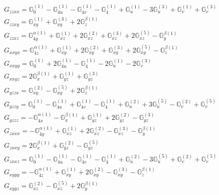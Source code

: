 \documentclass[fleqn,8pt,landscape]{jsarticle}
\begin{document}
\begin{align*}
& G_{zzxx} = \mathbb{G}_{0}^{(1)} - \mathbb{G}_{4u}^{(1)} - \mathbb{G}_{4v}^{(1)} - \mathbb{G}_{4}^{(1)} + \mathbb{G}_{u}^{(1)} - 3 \mathbb{G}_{u}^{(3)} + \mathbb{G}_{v}^{(1)} + \mathbb{G}_{v}^{(3)} \\
& G_{zzxy} = \mathbb{G}_{xy}^{(1)} + \mathbb{G}_{xy}^{(3)} + 2 \mathbb{G}_{z}^{\beta(1)} \\
& G_{zzxz} = \mathbb{G}_{4y}^{\alpha(1)} + \mathbb{G}_{xz}^{(1)} + 2 \mathbb{G}_{xz}^{(2)} + \mathbb{G}_{xz}^{(3)} + 2 \mathbb{G}_{xz}^{(5)} - \mathbb{G}_{y}^{\beta(1)} \\
& G_{xxyx} = \mathbb{G}_{4z}^{\alpha(1)} + \mathbb{G}_{xy}^{(1)} + 2 \mathbb{G}_{xy}^{(2)} + \mathbb{G}_{xy}^{(3)} + 2 \mathbb{G}_{xy}^{(5)} - \mathbb{G}_{z}^{\beta(1)} \\
& G_{xxyy} = \mathbb{G}_{0}^{(1)} + 2 \mathbb{G}_{4u}^{(1)} - \mathbb{G}_{4}^{(1)} - 2 \mathbb{G}_{u}^{(1)} - 2 \mathbb{G}_{v}^{(3)} \\
& G_{xxyz} = 2 \mathbb{G}_{x}^{\beta(1)} + \mathbb{G}_{yz}^{(1)} + \mathbb{G}_{yz}^{(3)} \\
& G_{yzzx} = \mathbb{G}_{xy}^{(2)} - \mathbb{G}_{xy}^{(5)} + 2 \mathbb{G}_{z}^{\beta(1)} \\
& G_{yzzy} = \mathbb{G}_{0}^{(1)} - \mathbb{G}_{4u}^{(1)} + \mathbb{G}_{4v}^{(1)} - \mathbb{G}_{4}^{(1)} + \mathbb{G}_{u}^{(2)} + 3 \mathbb{G}_{u}^{(5)} - \mathbb{G}_{v}^{(2)} + \mathbb{G}_{v}^{(5)} \\
& G_{yzzz} = - \mathbb{G}_{4x}^{\alpha(1)} - \mathbb{G}_{x}^{\beta(1)} + \mathbb{G}_{yz}^{(1)} + 2 \mathbb{G}_{yz}^{(2)} - \mathbb{G}_{yz}^{(3)} \\
& G_{zxxx} = - \mathbb{G}_{4y}^{\alpha(1)} + \mathbb{G}_{xz}^{(1)} + 2 \mathbb{G}_{xz}^{(2)} - \mathbb{G}_{xz}^{(3)} - \mathbb{G}_{y}^{\beta(1)} \\
& G_{zxxy} = 2 \mathbb{G}_{x}^{\beta(1)} + \mathbb{G}_{yz}^{(2)} - \mathbb{G}_{yz}^{(5)} \\
& G_{zxxz} = \mathbb{G}_{0}^{(1)} - \mathbb{G}_{4u}^{(1)} - \mathbb{G}_{4v}^{(1)} - \mathbb{G}_{4}^{(1)} + \mathbb{G}_{u}^{(2)} - 3 \mathbb{G}_{u}^{(5)} + \mathbb{G}_{v}^{(2)} + \mathbb{G}_{v}^{(5)} \\
& G_{xyyy} = - \mathbb{G}_{4z}^{\alpha(1)} + \mathbb{G}_{xy}^{(1)} + 2 \mathbb{G}_{xy}^{(2)} - \mathbb{G}_{xy}^{(3)} - \mathbb{G}_{z}^{\beta(1)} \\
& G_{xyyz} = \mathbb{G}_{xz}^{(2)} - \mathbb{G}_{xz}^{(5)} + 2 \mathbb{G}_{y}^{\beta(1)}
\end{align*}
\end{document}
